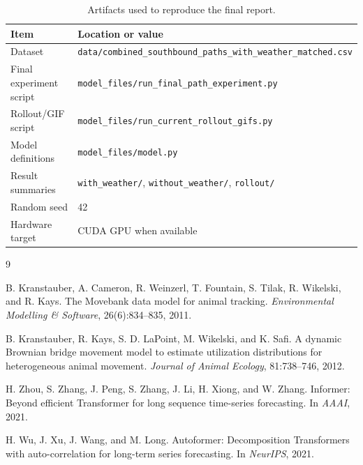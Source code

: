 \documentclass{article}
\begin{document}
\begin{table}[H]
\centering
\caption{Artifacts used to reproduce the final report.}
\label{tab:reproducibility}
\begin{tabular}{ll}
\toprule
Item & Location or value \\
\midrule
Dataset & \texttt{data/combined\_southbound\_paths\_with\_weather\_matched.csv} \\
Final experiment script & \texttt{model\_files/run\_final\_path\_experiment.py} \\
Rollout/GIF script & \texttt{model\_files/run\_current\_rollout\_gifs.py} \\
Model definitions & \texttt{model\_files/model.py} \\
Result summaries & \texttt{with\_weather/}, \texttt{without\_weather/}, \texttt{rollout/} \\
Random seed & 42 \\
Hardware target & CUDA GPU when available \\
\bottomrule
\end{tabular}
\end{table}

\begin{thebibliography}{9}

B. Kranstauber, A. Cameron, R. Weinzerl, T. Fountain, S. Tilak, R. Wikelski, and R. Kays.
\newblock The Movebank data model for animal tracking.
\newblock \emph{Environmental Modelling \& Software}, 26(6):834--835, 2011.

B. Kranstauber, R. Kays, S. D. LaPoint, M. Wikelski, and K. Safi.
\newblock A dynamic Brownian bridge movement model to estimate utilization distributions for heterogeneous animal movement.
\newblock \emph{Journal of Animal Ecology}, 81:738--746, 2012.

H. Zhou, S. Zhang, J. Peng, S. Zhang, J. Li, H. Xiong, and W. Zhang.
\newblock Informer: Beyond efficient Transformer for long sequence time-series forecasting.
\newblock In \emph{AAAI}, 2021.

H. Wu, J. Xu, J. Wang, and M. Long.
\newblock Autoformer: Decomposition Transformers with auto-correlation for long-term series forecasting.
\newblock In \emph{NeurIPS}, 2021.

\end{thebibliography}
\end{document}
